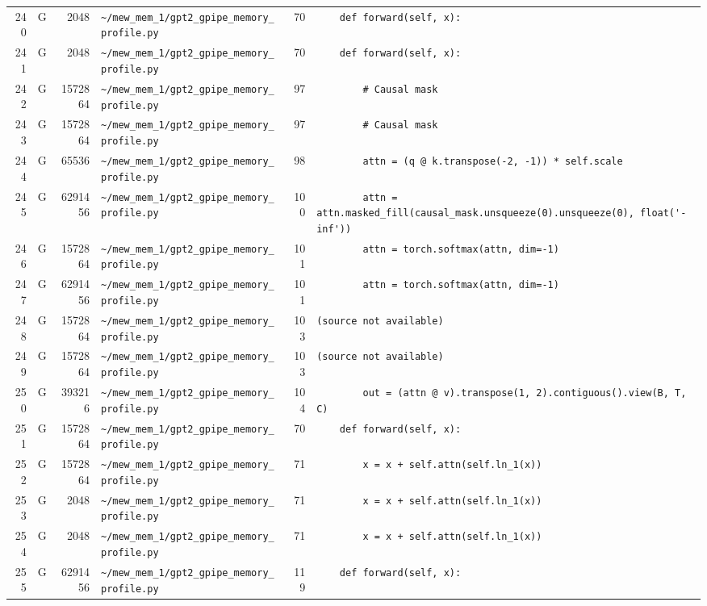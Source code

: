 \documentclass{article}
\begin{document}
\begin{longtable}{r l r p{6.5cm} r p{7.0cm}}
240 & G & 2048 & \lstinline|~/mew_mem_1/gpt2_gpipe_memory_profile.py| & 70 & \lstinline|    def forward(self, x):| \\
241 & G & 2048 & \lstinline|~/mew_mem_1/gpt2_gpipe_memory_profile.py| & 70 & \lstinline|    def forward(self, x):| \\
242 & G & 1572864 & \lstinline|~/mew_mem_1/gpt2_gpipe_memory_profile.py| & 97 & \lstinline|        # Causal mask| \\
243 & G & 1572864 & \lstinline|~/mew_mem_1/gpt2_gpipe_memory_profile.py| & 97 & \lstinline|        # Causal mask| \\
244 & G & 65536 & \lstinline|~/mew_mem_1/gpt2_gpipe_memory_profile.py| & 98 & \lstinline|        attn = (q @ k.transpose(-2, -1)) * self.scale| \\
245 & G & 6291456 & \lstinline|~/mew_mem_1/gpt2_gpipe_memory_profile.py| & 100 & \lstinline|        attn = attn.masked_fill(causal_mask.unsqueeze(0).unsqueeze(0), float('-inf'))| \\
246 & G & 1572864 & \lstinline|~/mew_mem_1/gpt2_gpipe_memory_profile.py| & 101 & \lstinline|        attn = torch.softmax(attn, dim=-1)| \\
247 & G & 6291456 & \lstinline|~/mew_mem_1/gpt2_gpipe_memory_profile.py| & 101 & \lstinline|        attn = torch.softmax(attn, dim=-1)| \\
248 & G & 1572864 & \lstinline|~/mew_mem_1/gpt2_gpipe_memory_profile.py| & 103 & \lstinline|(source not available)| \\
249 & G & 1572864 & \lstinline|~/mew_mem_1/gpt2_gpipe_memory_profile.py| & 103 & \lstinline|(source not available)| \\
250 & G & 393216 & \lstinline|~/mew_mem_1/gpt2_gpipe_memory_profile.py| & 104 & \lstinline|        out = (attn @ v).transpose(1, 2).contiguous().view(B, T, C)| \\
251 & G & 1572864 & \lstinline|~/mew_mem_1/gpt2_gpipe_memory_profile.py| & 70 & \lstinline|    def forward(self, x):| \\
252 & G & 1572864 & \lstinline|~/mew_mem_1/gpt2_gpipe_memory_profile.py| & 71 & \lstinline|        x = x + self.attn(self.ln_1(x))| \\
253 & G & 2048 & \lstinline|~/mew_mem_1/gpt2_gpipe_memory_profile.py| & 71 & \lstinline|        x = x + self.attn(self.ln_1(x))| \\
254 & G & 2048 & \lstinline|~/mew_mem_1/gpt2_gpipe_memory_profile.py| & 71 & \lstinline|        x = x + self.attn(self.ln_1(x))| \\
255 & G & 6291456 & \lstinline|~/mew_mem_1/gpt2_gpipe_memory_profile.py| & 119 & \lstinline|    def forward(self, x):| \\

\end{longtable}
\end{document}
